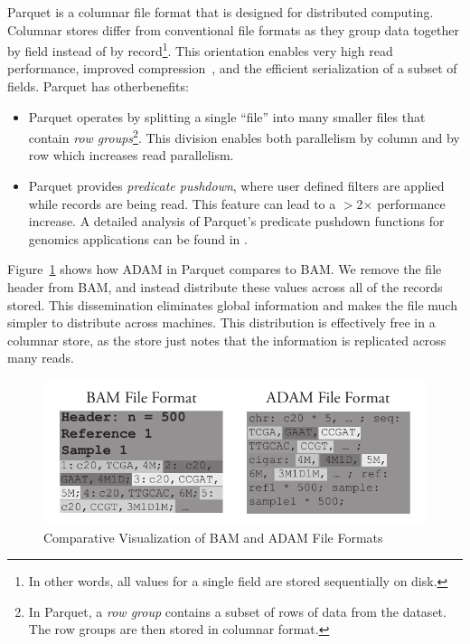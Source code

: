 \documentclass{bioinfo}
\begin{document}
Parquet is a columnar file format that is designed for distributed computing. Columnar stores differ from conventional file formats as they group data together
by field instead of by record\footnote{In other words, all values for a single field are stored sequentially on disk.}. This orientation enables very high read performance, improved
compression~\citep[see][]{abadi06}, and the efficient serialization of a subset of fields. Parquet has otherbenefits:

\begin{itemize}
\item Parquet operates by splitting a single ``file'' into many smaller files that contain \emph{row groups}\footnote{In Parquet, a \emph{row group} contains a subset
of rows of data from the dataset. The row groups are then stored in columnar format.}. This division enables both parallelism by column and by row which increases read
parallelism.
\item Parquet provides \emph{predicate pushdown}, where user defined filters are applied while records are being read. This feature can lead to a $>$2$\times$ performance increase.
A detailed analysis of Parquet's predicate pushdown functions for genomics applications can be found in \citet{massie13}.
\end{itemize}

Figure~\ref{fig:file-format} shows how ADAM in Parquet compares to BAM. We remove the file header from BAM, and instead distribute these values across all of the records
stored. This dissemination eliminates global information and makes the file much simpler to distribute across machines. This distribution is effectively free in a columnar store,
as the store just notes that the information is replicated across many reads.

\begin{figure}[h]
\begin{center}
\includegraphics[width=\linewidth]{file-format.pdf}
\end{center}
\caption{Comparative Visualization of BAM and ADAM File Formats}
\label{fig:file-format}
\end{figure}
\end{document}
